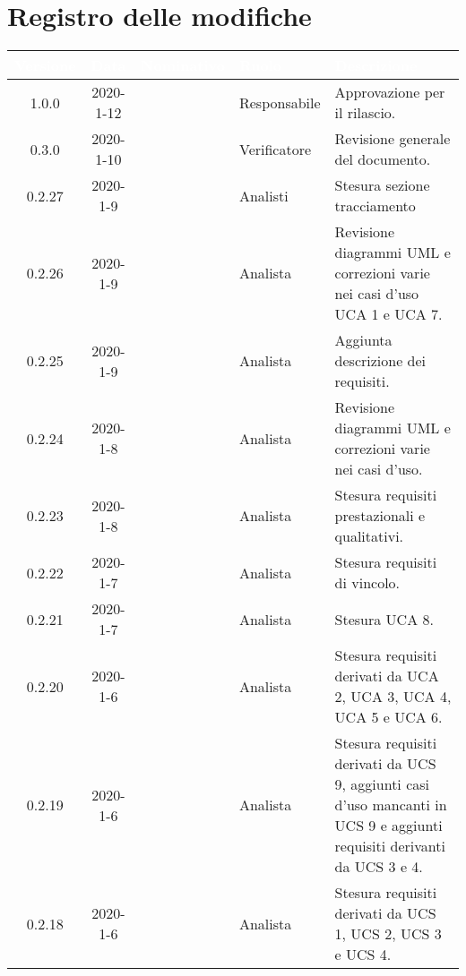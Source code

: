 \section*{Registro delle modifiche}
{
\renewcommand{\arraystretch}{1.5}
\centering
\begin{longtable}{ c c  C{4cm}  C{3cm} C{4cm}}
   \textcolor{white}{\textbf{Versione}} &
   \textcolor{white}{\textbf{Data}}&
   \textcolor{white}{\textbf{Nominativo}}&
   \textcolor{white}{\textbf{Ruolo}}&
   \textcolor{white}{\textbf{Descrizione}}\\
   \endhead


1.0.0 & 2020-1-12 & \AT{} & Responsabile & Approvazione per il rilascio. \\

0.3.0 & 2020-1-10 & \SE{} & Verificatore & Revisione generale del documento. \\

0.2.27 & 2020-1-9 & \CE{} \PF{} \DF{} & Analisti & Stesura sezione tracciamento \\

0.2.26 & 2020-1-9 & \PF{} & Analista & Revisione diagrammi UML e correzioni varie nei casi d'uso UCA 1 e UCA 7. \\

0.2.25 & 2020-1-9 & \CE{} & Analista & Aggiunta descrizione dei requisiti. \\

0.2.24 & 2020-1-8 & \CE{} & Analista & Revisione diagrammi UML e correzioni varie nei casi d'uso. \\

0.2.23 & 2020-1-8 & \DF{} & Analista & Stesura requisiti prestazionali e qualitativi. \\

0.2.22 & 2020-1-7 & \PF{} & Analista & Stesura requisiti di vincolo. \\

0.2.21 & 2020-1-7 & \PF{} & Analista & Stesura UCA 8. \\

0.2.20 & 2020-1-6 & \PF{} & Analista & Stesura requisiti derivati da UCA 2, UCA 3, UCA 4, UCA 5 e UCA 6. \\

0.2.19 & 2020-1-6 & \DF{} & Analista & Stesura requisiti derivati da UCS 9, aggiunti casi d'uso mancanti in UCS 9 e aggiunti requisiti derivanti da UCS 3 e 4. \\

0.2.18 & 2020-1-6 & \CE{} & Analista & Stesura requisiti derivati da UCS 1, UCS 2, UCS 3 e UCS 4. \\


\end{longtable}}
